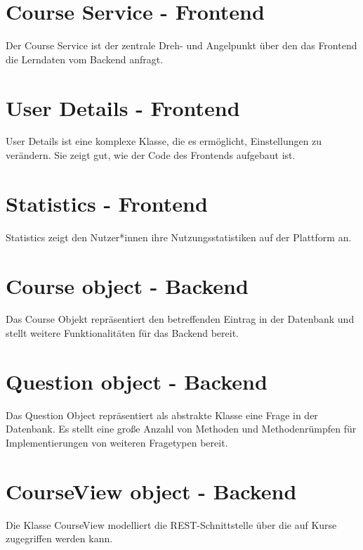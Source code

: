 \documentclass[accentcolor=tud0b,12pt,paper=a4]{tudreport}
\begin{document}
	\section*{Course Service - Frontend}
	Der Course Service ist der zentrale Dreh- und Angelpunkt über den das Frontend die Lerndaten vom Backend anfragt.

	

	\section*{User Details - Frontend}
	User Details ist eine komplexe Klasse, die es ermöglicht, Einstellungen zu verändern. Sie zeigt gut, wie der Code des Frontends aufgebaut ist.

	

	\section*{Statistics - Frontend}
	Statistics zeigt den Nutzer*innen ihre Nutzungsstatistiken auf der Plattform an. 

	

	\section*{Course object - Backend}
	Das Course Objekt repräsentiert den betreffenden Eintrag in der Datenbank und stellt weitere Funktionalitäten für das Backend bereit.

	

	\section*{Question object - Backend} 
	Das Question Object repräsentiert als abstrakte Klasse eine Frage in der Datenbank. Es stellt eine große Anzahl von Methoden und Methodenrümpfen für Implementierungen von weiteren Fragetypen bereit.

	

	\section*{CourseView object - Backend}
	Die Klasse CourseView modelliert die REST-Schnittstelle über die auf Kurse zugegriffen werden kann.
\end{document}
